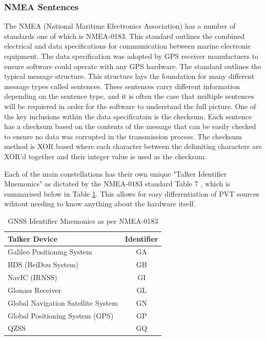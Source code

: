 \subsubsection{NMEA Sentences} \label{subsubsec:NMEA}
The NMEA (National Maritime Electronics Association) has a number of standards one of which is NMEA-0183. This standard outlines the combined electrical and data
specifications for communication between marine electronic equipment. The data specification was adopted by GPS receiver manufactuers to ensure software could operate
with any GPS hardware. The standard outlines the typical message structure. This structure lays the foundation for many different message types called sentences. These
sentences carry different information depending on the sentence type, and it is often the case that multiple sentences will be requiered in order for the software to
understand the full picture. One of the key inclusions within the data specificatoin is the checksum. Each sentence has a checksum based on the contents of the message
that can be easily checked to ensure no data was corrupted in the transmission process. The checksum method is XOR based where each character between the delimiting
characters are XOR'd together and their integer value is used as the checksum.

Each of the main constellations has their own unique "Talker Identifier Mnemonics" as dictated by the NMEA-0183 standard Table 7 , which is summarised
below in Table \ref{tab:NMEA Mnemonics}. This allows for easy differentiation of PVT sources wihtout needing to know anything about the hardware itself.

\renewcommand{\arraystretch}{1.5}
\begin{table}
    \begin{center}
        \caption{GNSS Identifier Mnemonics as per NMEA-0183}
        \label{tab:NMEA Mnemonics}
        \begin{tabular}{ |l|c| }
            \hline
            \textbf{Talker Device} & \textbf{Identifier} \\
            \hline
            Galileo Positioning System & GA \\
            \hline
            BDS (BeiDou System) & GB \\
            \hline
            NavIC (IRNSS) & GI \\
            \hline
            Glonass Receiver & GL \\
            \hline
            Global Navigation Satellite System & GN \\
            \hline
            Global Positioning System (GPS) & GP \\
            \hline
            QZSS & GQ \\
            \hline
        \end{tabular}
    \end{center}
\end{table}
\renewcommand{\arraystretch}{1}


